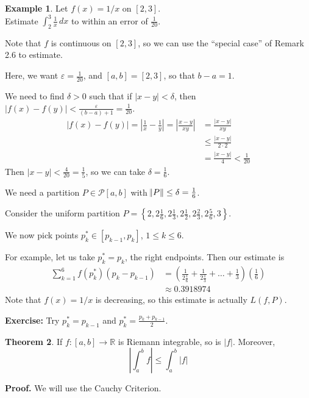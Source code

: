 \documentclass[11pt]{article}
\theoremstyle{definition}
\newtheorem{thm}{Theorem}[section]
\newtheorem{exmp}[thm]{Example}
\newcommand{\mbR}{\ensuremath{\mathbb{R}}}
\begin{document}
\begin{exmp}
Let $f(x) = 1/x$ on $[2, 3]$. \\ Estimate $\int_2^3 \frac1x\,dx$ to within an error of $\frac{1}{20}$. 

Note that $f$ is continuous on $[2, 3]$, so we can use the ``special case'' of Remark 2.6 to estimate. 

Here, we want $\varepsilon = \frac{1}{20}$, and $[a, b] = [2, 3]$, so that $b - a = 1$. 

We need to find $\delta > 0$ such that if $|x - y| < \delta$, then 
$|f(x) - f(y)| < \frac{\varepsilon}{(b-a) + 1} = \frac{1}{20}$. 
\begin{align*}
|f(x) - f(y)| = \left|\frac1x - \frac1y\right| = \left|\frac{x-y}{xy}\right| & = \frac{|x-y|}{xy} \\
& \leq \frac{|x-y|}{2\cdot2} \\
& = \frac{|x-y|}{4} < \frac{1}{20}
\end{align*}
Then $|x - y| < \frac{4}{20} = \frac15$, so we can take $\delta = \frac16$. 

We need a partition $P \in \mathcal{P}[a, b]$ with $\norm{P} \leq \delta = \frac16$. 

Consider the uniform partition $P = \left\{2, 2\frac16, 2\frac13, 2\frac12, 2\frac23, 2\frac56, 3\right\}$.

We now pick points $p_k^* \in [p_{k-1}, p_k]$, $1 \leq k \leq 6$. 

For example, let us take $p_k^* = p_k$, the right endpoints. Then our estimate is
\begin{align*}
\sum_{k=1}^6 f(p_k^*)(p_k - p_{k-1}) & = \left(\frac{1}{2\frac16} + \frac{1}{2\frac13} + \dots + \frac13\right)\left(\frac16\right) \\ & \approx 0.3918974
\end{align*}
Note that $f(x) = 1/x$ is decreasing, so this estimate is actually $L(f, P)$. 

\textbf{Exercise:} Try $p_k^* = p_{k-1}$ and $p_k^* = \frac{p_k + p_{k-1}}2$.
\end{exmp}

\begin{thm}
If $f : [a, b] \to \mbR$ is Riemann integrable, so is $|f|$. Moreover,
$$\left|\int_a^b f \right| \leq \int_a^b |f|$$
\end{thm}
\textbf{Proof.} We will use the Cauchy Criterion. 
\end{document}
